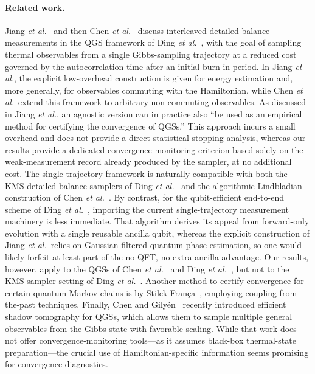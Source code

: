 \documentclass[showpacs,amsmath,amssymb,twocolumn,prx,superscriptaddress,10pt,aps,nofootinbib]{revtex4-2}
\begin{document}
\paragraph{Related work.} Jiang \textit{et al.}~\cite{Jiang2026} and then Chen \textit{et al.}~\cite{Chen2026b} discuss interleaved detailed-balance measurements in the QGS framework of Ding \textit{et al.}~\cite{Ding2024}, with the goal of sampling thermal observables from a single Gibbs-sampling trajectory at a reduced cost governed by the autocorrelation time after an initial burn-in period. In Jiang \textit{et al.}, the explicit low-overhead construction is given for energy estimation and, more generally, for observables commuting with the Hamiltonian, while Chen \textit{et al.}~extend this framework to arbitrary non-commuting observables. As discussed in Jiang \textit{et al.}, an agnostic version can in practice also ``be used as an empirical method for certifying the convergence of QGSs.'' This approach incurs a small overhead and does not provide a direct statistical stopping analysis, whereas our results provide a dedicated convergence-monitoring criterion based solely on the weak-measurement record already produced by the sampler, at no additional cost. The single-trajectory framework is naturally compatible with both the KMS-detailed-balance samplers of Ding \textit{et al.}~\cite{Ding2024} and the algorithmic Lindbladian construction of Chen \textit{et al.}~\cite{chen2025efficient}. By contrast, for the qubit-efficient end-to-end scheme of Ding \textit{et al.}~\cite{Ding2025}, importing the current single-trajectory measurement machinery is less immediate. That algorithm derives its appeal from forward-only evolution with a single reusable ancilla qubit, whereas the explicit construction of Jiang \textit{et al.}~relies on Gaussian-filtered quantum phase estimation, so one would likely forfeit at least part of the no-QFT, no-extra-ancilla advantage. Our results, however, apply to the QGSs of Chen \textit{et al.}~\cite{chen2025efficient} and Ding \textit{et al.}~\cite{Ding2025}, but not to the KMS-sampler setting of Ding \textit{et al.}~\cite{Ding2024}. Another method to certify convergence for certain quantum Markov chains is by Stilck França~\cite{Stilck2018}, employing coupling-from-the-past techniques. Finally, Chen and Gily\'en~\cite{Chen2026} recently introduced efficient shadow tomography for QGSs, which allows them to sample multiple general observables from the Gibbs state with favorable scaling. While that work does not offer convergence-monitoring tools---as it assumes black-box thermal-state preparation---the crucial use of Hamiltonian-specific information seems promising for convergence diagnostics.
\end{document}
